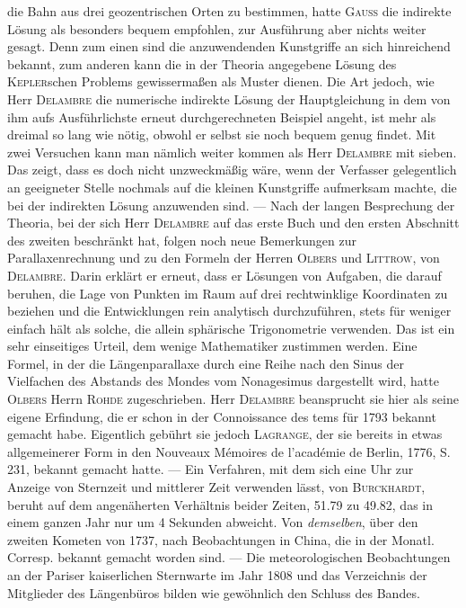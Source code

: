 die Bahn aus drei geozentrischen Orten zu bestimmen, hatte \textsc{Gauss} die indirekte Lösung als besonders bequem empfohlen, zur Ausführung aber nichts weiter gesagt. Denn zum einen sind die anzuwendenden Kunstgriffe an sich hinreichend bekannt, zum anderen kann die in der Theoria angegebene Lösung des \textsc{Kepler}schen Problems gewissermaßen als Muster dienen. Die Art jedoch, wie Herr \textsc{Delambre} die numerische indirekte Lösung der Hauptgleichung in dem von ihm aufs Ausführlichste erneut durchgerechneten Beispiel angeht, ist mehr als dreimal so lang wie nötig, obwohl er selbst sie noch bequem genug findet. Mit zwei Versuchen kann man nämlich weiter kommen als Herr \textsc{Delambre} mit sieben. Das zeigt, dass es doch nicht unzweckmäßig wäre, wenn der Verfasser gelegentlich an geeigneter Stelle nochmals auf die kleinen Kunstgriffe aufmerksam machte, die bei der indirekten Lösung anzuwenden sind. --- Nach der langen Besprechung der Theoria, bei der sich Herr \textsc{Delambre} auf das erste Buch und den ersten Abschnitt des zweiten beschränkt hat, folgen noch neue Bemerkungen zur Parallaxenrechnung und zu den Formeln der Herren \textsc{Olbers} und \textsc{Littrow}, von \textsc{Delambre}. Darin erklärt er erneut, dass er Lösungen von Aufgaben, die darauf beruhen, die Lage von Punkten im Raum auf drei rechtwinklige Koordinaten zu beziehen und die Entwicklungen rein analytisch durchzuführen, stets für weniger einfach hält als solche, die allein sphärische Trigonometrie verwenden. Das ist ein sehr einseitiges Urteil, dem wenige Mathematiker zustimmen werden. Eine Formel, in der die Längenparallaxe durch eine Reihe nach den Sinus der Vielfachen des Abstands des Mondes vom Nonagesimus dargestellt wird, hatte \textsc{Olbers} Herrn \textsc{Rohde} zugeschrieben. Herr \textsc{Delambre} beansprucht sie hier als seine eigene Erfindung, die er schon in der Connoissance des tems für 1793 bekannt gemacht habe. Eigentlich gebührt sie jedoch \textsc{Lagrange}, der sie bereits in etwas allgemeinerer Form in den Nouveaux Mémoires de l'académie de Berlin, 1776, S. 231, bekannt gemacht hatte. --- Ein Verfahren, mit dem sich eine Uhr zur Anzeige von Sternzeit und mittlerer Zeit verwenden lässt, von \textsc{Burckhardt}, beruht auf dem angenäherten Verhältnis beider Zeiten, 51.79 zu 49.82, das in einem ganzen Jahr nur um 4 Sekunden abweicht. Von \emph{demselben}, über den zweiten Kometen von 1737, nach Beobachtungen in China, die in der Monatl. Corresp. bekannt gemacht worden sind. --- Die meteorologischen Beobachtungen an der Pariser kaiserlichen Sternwarte im Jahr 1808 und das Verzeichnis der Mitglieder des Längenbüros bilden wie gewöhnlich den Schluss des Bandes.
